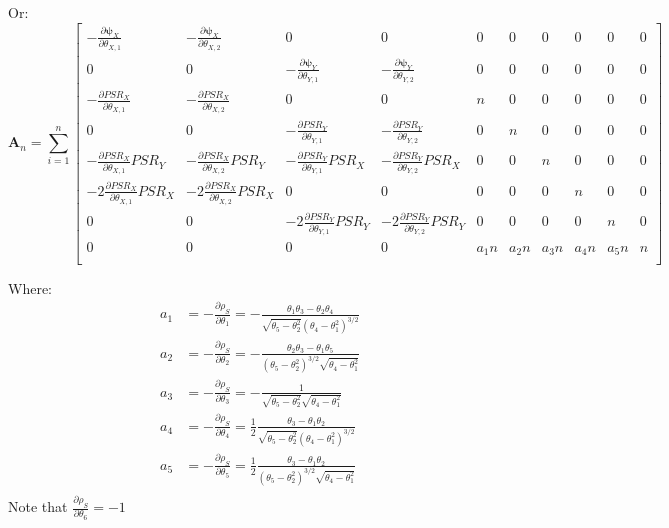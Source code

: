 \documentclass[]{article}
\begin{document}
Or:
\[
\pmb{A}_n =  \sum_{i = 1}^{n} \begin{bmatrix}
   -\frac{\partial \pmb{\psi}_X}{\partial \theta_{X, 1}}    &  -\frac{\partial \pmb{\psi}_X}{\partial \theta_{X, 2}}    &   0   &   0   &     0     &     0    &    0    &    0    &    0    &   0 \\
    0   &   0   &   -\frac{\partial \pmb{\psi}_Y}{\partial \theta_{Y, 1}} &   -\frac{\partial \pmb{\psi}_Y}{\partial \theta_{Y,2}}      &     0     &     0    &    0    &    0    &    0    &   0  \\
    -\frac{\partial PSR_X}{\partial \theta_{X,1}}   &  -\frac{\partial PSR_X}{\partial \theta_{X,2}}   & 0   &   0   &   n   &   0  & 0 & 0 & 0 & 0\\
    0 & 0 &    -\frac{\partial PSR_Y}{\partial \theta_{Y,1}}   &  -\frac{\partial PSR_Y}{\partial \theta_{Y,2}}   & 0 & n & 0 & 0 & 0 & 0 \\
     -\frac{\partial PSR_X}{\partial \theta_{X,1}} PSR_Y  &  -\frac{\partial PSR_X}{\partial \theta_{X,2}}PSR_Y & -\frac{\partial PSR_Y}{\partial \theta_{Y,1}} PSR_X  &  -\frac{\partial PSR_Y}{\partial \theta_{Y,2}}PSR_X & 0 & 0 &  n & 0 & 0 & 0 \\
    -2\frac{\partial PSR_X}{\partial \theta_{X,1}} PSR_X  &  -2\frac{\partial PSR_X}{\partial \theta_{X,2}}PSR_X & 0 & 0 & 0 & 0 &  0 & n & 0 & 0 \\
    0 & 0 & -2\frac{\partial PSR_Y}{\partial \theta_{Y,1}}PSR_Y  &  -2\frac{\partial PSR_Y}{\partial \theta_{Y,2}}PSR_Y & 0 & 0 &  0 & 0 & n & 0 \\
    0 & 0 & 0 & 0 & a_1n & a_2n &  a_3n & a_4n & a_5n & n \\
\end{bmatrix}
\]

Where:
  $$
  \begin{aligned}
    a_1 &= -\frac{\partial \rho_S}{\partial \theta_1} = -\frac{\theta_1\theta_3 - \theta_2\theta_4}{\sqrt{\theta_5 - \theta_2^2}(\theta_4 - \theta_1^2)^{3/2}}\\
    a_2 &= -\frac{\partial \rho_S}{\partial \theta_2} = -\frac{\theta_2\theta_3 - \theta_1\theta_5}{(\theta_5 - \theta_2^2)^{3/2} \sqrt{\theta_4 - \theta_1^2}}\\
    a_3 &= -\frac{\partial \rho_S}{\partial \theta_3} = -\frac{1}{\sqrt{\theta_5 - \theta_2^2}\sqrt{\theta_4 - \theta_1^2}}\\
    a_4 &= -\frac{\partial \rho_S}{\partial \theta_4} = \frac{1}{2}\frac{\theta_3 - \theta_1\theta_2}{\sqrt{\theta_5 - \theta_2^2}(\theta_4 - \theta_1^2)^{3/2}}\\
    a_5 &= -\frac{\partial \rho_S}{\partial \theta_5} = \frac{1}{2}\frac{\theta_3 - \theta_1\theta_2}{(\theta_5 - \theta_2^2)^{3/2} \sqrt{\theta_4 - \theta_1^2}}\\
   \end{aligned}
  $$
Note that $\frac{\partial \rho_S}{\partial \theta_6} = -1$
\end{document}
